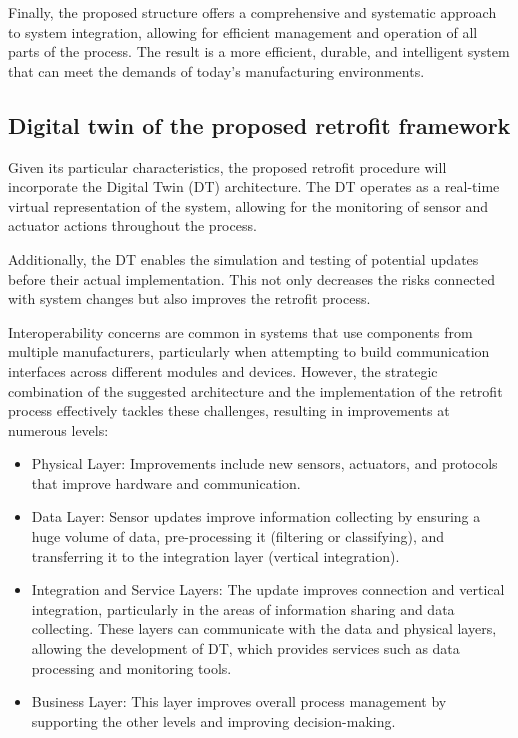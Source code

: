 \documentclass[journal]{IEEEtran}
\begin{document}
Finally, the proposed structure offers a comprehensive and systematic approach to system integration, allowing for efficient management and operation of all parts of the process. The result is a more efficient, durable, and intelligent system that can meet the demands of today's manufacturing environments.

\subsection{Digital twin of the proposed retrofit framework}

Given its particular characteristics, the proposed retrofit procedure will incorporate the Digital Twin (DT) architecture. The DT operates as a real-time virtual representation of the system, allowing for the monitoring of sensor and actuator actions throughout the process.

Additionally, the DT enables the simulation and testing of potential updates before their actual implementation. This not only decreases the risks connected with system changes but also improves the retrofit process. 


Interoperability concerns are common in systems that use components from multiple manufacturers, particularly when attempting to build communication interfaces across different modules and devices. However, the strategic combination of the suggested architecture and the implementation of the retrofit process effectively tackles these challenges, resulting in improvements at numerous levels:

\begin{itemize}
    \item Physical Layer: Improvements include new sensors, actuators, and protocols that improve hardware and communication.
    \item Data Layer: Sensor updates improve information collecting by ensuring a huge volume of data, pre-processing it (filtering or classifying), and transferring it to the integration layer (vertical integration).
    \item Integration and Service Layers: The update improves connection and vertical integration, particularly in the areas of information sharing and data collecting. These layers can communicate with the data and physical layers, allowing the development of DT, which provides services such as data processing and monitoring tools.
    \item Business Layer: This layer improves overall process management by supporting the other levels and improving decision-making.   
\end{itemize}
\end{document}
